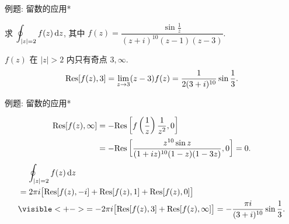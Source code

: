 %


\begin{frame}{例题: 留数的应用*}
\begin{example}
求 $\displaystyle\oint_{|z|=2}f(z)\,\mathrm{d} z$, 其中 $f(z)=\dfrac{\sin\frac1z}{(z+i)^{10}(z-1)(z-3)}$.
\end{example}
\begin{solution}
$f(z)$ 在 $|z|>2$ 内只有奇点 $3,\infty$.
\onslide<+->
\[{\mathrm{Res}}[f(z),3]=\lim_{z\to3}(z-3)f(z)=\frac1{2(3+i)^{10}}\sin\frac13.\]
\end{solution}
\end{frame}


\begin{frame}{例题: 留数的应用*}
\begin{solutionc}
\begin{align*}
{\mathrm{Res}}[f(z),\infty]&=-{\mathrm{Res}}\left[f\left(\frac1z\right)\frac1{z^2},0\right]\\
&=-{\mathrm{Res}}\left[\frac{z^{10}\sin z}{(1+iz)^{10}(1-z)(1-3z)},0\right]=0.
\end{align*}
\onslide<+->
\begin{align*}
&\peq\oint_{|z|=2}f(z)\diff z\\
&=2\pi i\bigl[\Res[f(z),-i]+\Res[f(z),1]+\Res[f(z),0]\bigr]\\
&\visible<+->{=-2\pi i\bigl[\Res[f(z),3]+\Res[f(z),\infty]\bigr]=-\frac{\pi i}{(3+i)^{10}}\sin\frac13.}
\end{align*}
\end{solutionc}
\end{frame}


